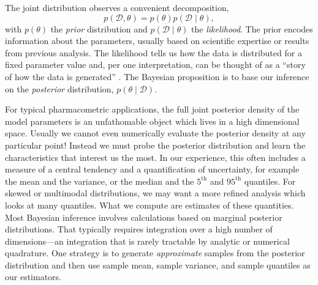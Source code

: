 The joint distribution observes a convenient decomposition,
\begin{equation*}
  p(\mathcal D, \theta) = p(\theta) p(\mathcal D \mid \theta),
\end{equation*}
%
with $p(\theta)$ the \textit{prior} distribution and $p(\mathcal D \mid \theta)$ the \textit{likelihood}.
The prior encodes information about the parameters, usually based on scientific expertise or results from previous analysis.
The likelihood tells us how the data is distributed for a fixed parameter value and, per one interpretation, can be thought of as a ``story of how the data is generated'' \cite{Gelman:2013b}.
%
The Bayesian proposition is to base our inference on the \textit{posterior} distribution, $p(\theta \mid \mathcal D)$.


For typical pharmacometric applications, the full joint posterior density of the model parameters is an unfathomable object which lives in a high dimensional space.
Usually we cannot even numerically evaluate the posterior density at any particular point!
Instead we must probe the posterior distribution and learn the characteristics that interest us the most.
In our experience, this often includes a measure of a central tendency and a quantification of uncertainty, for example the mean and the variance, or the median and the $5^\mathrm{th}$ and $95^\mathrm{th}$ quantiles.
For skewed or multimodal distributions, we may want a more refined analysis which looks at many quantiles.
What we compute are estimates of these quantities. 
Most Bayesian inference involves calculations based on marginal posterior distributions. That typically requires integration over a high number of dimensions---an integration that is rarely tractable by analytic or numerical quadrature.
One strategy is to generate \textit{approximate} samples from the posterior distribution and then use sample mean, sample variance, and sample quantiles as our estimators.

